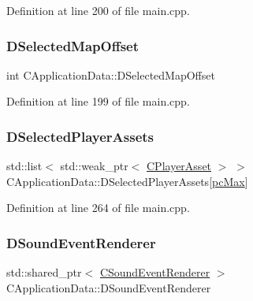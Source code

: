 Definition at line 200 of file main.\+cpp.

\hypertarget{classCApplicationData_a443edd0c2c7964fc51a82bf2a016725b}{}\label{classCApplicationData_a443edd0c2c7964fc51a82bf2a016725b} 
\subsubsection{\texorpdfstring{D\+Selected\+Map\+Offset}{DSelectedMapOffset}}
{\footnotesize\ttfamily int C\+Application\+Data\+::\+D\+Selected\+Map\+Offset\hspace{0.3cm}{\ttfamily [protected]}}



Definition at line 199 of file main.\+cpp.

\hypertarget{classCApplicationData_a05c1087d5a5c4ddc14fcb37444f1642b}{}\label{classCApplicationData_a05c1087d5a5c4ddc14fcb37444f1642b} 
\subsubsection{\texorpdfstring{D\+Selected\+Player\+Assets}{DSelectedPlayerAssets}}
{\footnotesize\ttfamily std\+::list$<$ std\+::weak\+\_\+ptr$<$ \hyperlink{classCPlayerAsset}{C\+Player\+Asset} $>$ $>$ C\+Application\+Data\+::\+D\+Selected\+Player\+Assets\mbox{[}\hyperlink{GameDataTypes_8h_aafb0ca75933357ff28a6d7efbdd7602fa594a5c8dd3987f24e8a0f23f1a72cd34}{pc\+Max}\mbox{]}\hspace{0.3cm}{\ttfamily [protected]}}



Definition at line 264 of file main.\+cpp.

\hypertarget{classCApplicationData_af2959556fc881145d9d777c627a9345d}{}\label{classCApplicationData_af2959556fc881145d9d777c627a9345d} 
\subsubsection{\texorpdfstring{D\+Sound\+Event\+Renderer}{DSoundEventRenderer}}
{\footnotesize\ttfamily std\+::shared\+\_\+ptr$<$ \hyperlink{classCSoundEventRenderer}{C\+Sound\+Event\+Renderer} $>$ C\+Application\+Data\+::\+D\+Sound\+Event\+Renderer\hspace{0.3cm}{\ttfamily [protected]}}



